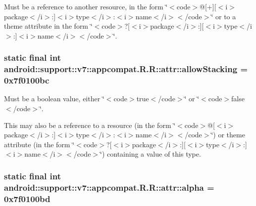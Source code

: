 Must be a reference to another resource, in the form \char`\"{}$<$code$>$@\mbox{[}+\mbox{]}\mbox{[}$<$i$>$package$<$/i$>$:\mbox{]}$<$i$>$type$<$/i$>$:$<$i$>$name$<$/i$>$$<$/code$>$\char`\"{} or to a theme attribute in the form \char`\"{}$<$code$>$?\mbox{[}$<$i$>$package$<$/i$>$:\mbox{]}\mbox{[}$<$i$>$type$<$/i$>$:\mbox{]}$<$i$>$name$<$/i$>$$<$/code$>$\char`\"{}. \hypertarget{classandroid_1_1support_1_1v7_1_1appcompat_1_1_r_1_1attr_c119220a418fa347dab842cc5692d530}{
\subsubsection[{allowStacking}]{\setlength{\rightskip}{0pt plus 5cm}static final int android::support::v7::appcompat.R.R::attr::allowStacking = 0x7f0100bc}}
\label{classandroid_1_1support_1_1v7_1_1appcompat_1_1_r_1_1attr_c119220a418fa347dab842cc5692d530}


Must be a boolean value, either \char`\"{}$<$code$>$true$<$/code$>$\char`\"{} or \char`\"{}$<$code$>$false$<$/code$>$\char`\"{}. 

This may also be a reference to a resource (in the form \char`\"{}$<$code$>$@\mbox{[}$<$i$>$package$<$/i$>$:\mbox{]}$<$i$>$type$<$/i$>$:$<$i$>$name$<$/i$>$$<$/code$>$\char`\"{}) or theme attribute (in the form \char`\"{}$<$code$>$?\mbox{[}$<$i$>$package$<$/i$>$:\mbox{]}\mbox{[}$<$i$>$type$<$/i$>$:\mbox{]}$<$i$>$name$<$/i$>$$<$/code$>$\char`\"{}) containing a value of this type. \hypertarget{classandroid_1_1support_1_1v7_1_1appcompat_1_1_r_1_1attr_d3541270a4b4be4b121f38ad9eef334a}{
\subsubsection[{alpha}]{\setlength{\rightskip}{0pt plus 5cm}static final int android::support::v7::appcompat.R.R::attr::alpha = 0x7f0100bd}}
\label{classandroid_1_1support_1_1v7_1_1appcompat_1_1_r_1_1attr_d3541270a4b4be4b121f38ad9eef334a}


